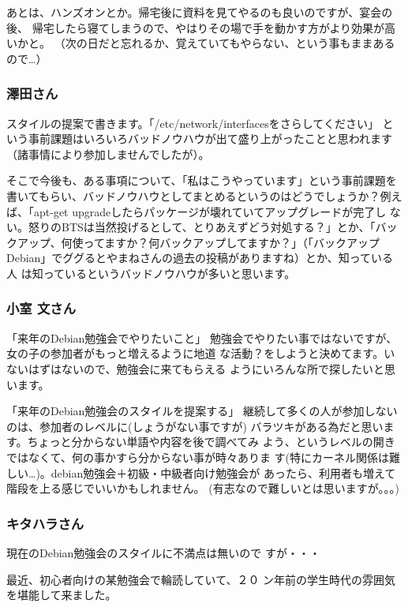 \documentclass[mingoth,a4paper]{jsarticle}
\begin{document}
あとは、ハンズオンとか。帰宅後に資料を見てやるのも良いのですが、宴会の後、
帰宅したら寝てしまうので、やはりその場で手を動かす方がより効果が高いかと。
（次の日だと忘れるか、覚えていてもやらない、という事もままあるので…）

\subsubsection{澤田さん}

スタイルの提案で書きます。「/etc/network/interfacesをさらしてください」
という事前課題はいろいろバッドノウハウが出て盛り上がったことと思われます
（諸事情により参加しませんでしたが）。

そこで今後も、ある事項について、「私はこうやっています」という事前課題を
書いてもらい、バッドノウハウとしてまとめるというのはどうでしょうか？例え
ば、「apt-get upgradeしたらパッケージが壊れていてアップグレードが完了し
ない。怒りのBTSは当然投げるとして、とりあえずどう対処する？」とか、「バッ
クアップ、何使ってますか？何バックアップしてますか？」（「バックアップ 
Debian」でググるとやまねさんの過去の投稿がありますね）とか、知っている人
は知っているというバッドノウハウが多いと思います。


\subsubsection{小室 文さん}

「来年のDebian勉強会でやりたいこと」
勉強会でやりたい事ではないですが、女の子の参加者がもっと増えるように地道
な活動？をしようと決めてます。いないはずはないので、勉強会に来てもらえる
ようにいろんな所で探したいと思います。


「来年のDebian勉強会のスタイルを提案する」
継続して多くの人が参加しないのは、参加者のレベルに(しょうがない事ですが)
バラツキがある為だと思います。ちょっと分からない単語や内容を後で調べてみ
よう、というレベルの開きではなくて、何の事かすら分からない事が時々ありま
す(特にカーネル関係は難しい…)。debian勉強会＋初級・中級者向け勉強会が
あったら、利用者も増えて階段を上る感じでいいかもしれません。
(有志なので難しいとは思いますが。。。)

\subsubsection{キタハラさん}

    現在のDebian勉強会のスタイルに不満点は無いので
すが・・・

    最近、初心者向けの某勉強会で輪読していて、２０
ン年前の学生時代の雰囲気を堪能して来ました。
\end{document}
